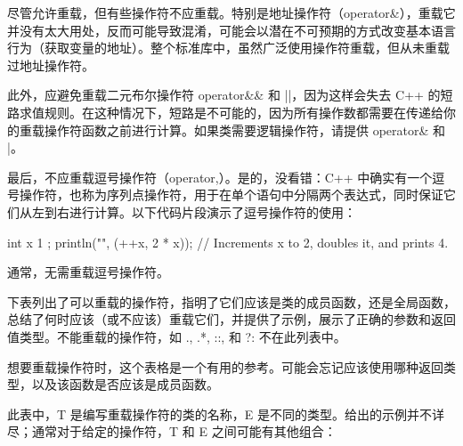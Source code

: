 
尽管允许重载，但有些操作符不应重载。特别是地址操作符（operator\&），重载它并没有太大用处，反而可能导致混淆，可能会以潜在不可预期的方式改变基本语言行为（获取变量的地址）。整个标准库中，虽然广泛使用操作符重载，但从未重载过地址操作符。

此外，应避免重载二元布尔操作符 operator\&\& 和 ||，因为这样会失去 C++ 的短路求值规则。在这种情况下，短路是不可能的，因为所有操作数都需要在传递给你的重载操作符函数之前进行计算。如果类需要逻辑操作符，请提供 operator\& 和 |。

最后，不应重载逗号操作符（operator,）。是的，没看错：C++ 中确实有一个逗号操作符，也称为序列点操作符，用于在单个语句中分隔两个表达式，同时保证它们从左到右进行计算。以下代码片段演示了逗号操作符的使用：

\begin{cpp}
int x { 1 };
println("{}", (++x, 2 * x)); // Increments x to 2, doubles it, and prints 4.
\end{cpp}

通常，无需重载逗号操作符。


下表列出了可以重载的操作符，指明了它们应该是类的成员函数，还是全局函数，总结了何时应该（或不应该）重载它们，并提供了示例，展示了正确的参数和返回值类型。不能重载的操作符，如 ., .*, ::, 和 ?: 不在此列表中。

想要重载操作符时，这个表格是一个有用的参考。可能会忘记应该使用哪种返回类型，以及该函数是否应该是成员函数。

此表中，T 是编写重载操作符的类的名称，E 是不同的类型。给出的示例并不详尽；通常对于给定的操作符，T 和 E 之间可能有其他组合：

